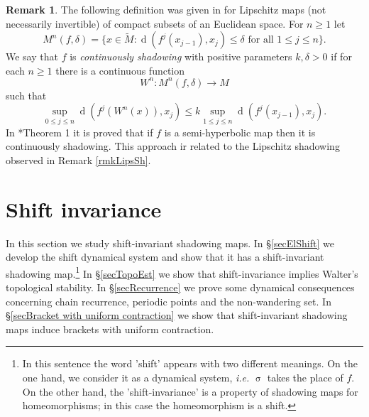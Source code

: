 \documentclass[12pt]{amsart}
\DeclareMathOperator{\shift}{\sigma}
\theoremstyle{plain}
\theoremstyle{definition}
\newtheorem{rmk}[thm]{Remark}
\theoremstyle{remark}
\DeclareMathOperator{\dist}{d}
\newcommand{\tM}{\tilde{M}}
\newcommand{\rojo}[1]{\textcolor{red}{#1}}
\begin{document}
\begin{rmk}
	\label{rmkKOP}
	The following definition was given in \cite{KOP} for Lipschitz maps (not necessarily invertible) of compact subsets of an Euclidean space.
	For $n\geq 1$ let
	\[
	M^n(f,\delta)=\{x\in\tM:\dist(f^j(x_{j-1}),x_j)\leq\delta\text{ for all }1\leq j\leq n\}.
	\]
	We say that $f$ is \textit{continuously shadowing} with positive parameters $k,\delta>0$
	if for each $n\geq 1$ there is a continuous function
	\[
	W^n\colon M^n(f,\delta)\to M
	\]
	such that
	\begin{equation}
		\label{ecuContShKop}
		\sup_{0\leq j\leq n}\dist(f^j(W^n(x)),x_j) \leq k \sup_{1\leq j\leq n}\dist(f^j(x_{j-1}),x_j).
	\end{equation}
	In \cite{KOP}*{Theorem 1} it is proved that
	if $f$ is a semi-hyperbolic map then it is continuously shadowing.
	This approach ir related to the Lipschitz shadowing observed in Remark \ref{rmkLipsSh}.
\end{rmk}

%
%
%

\section{Shift invariance}
\label{secShInvShm}
In this section we study shift-invariant shadowing maps.
In \S\ref{secElShift} we develop the shift dynamical system and show that it has a shift-invariant shadowing map.\footnote{In this sentence the word 'shift' appears with two different meanings. On the one hand, we consider it as a dynamical system, \textit{i.e.} $\shift$ takes the place of $f$.
On the other hand, the 'shift-invariance' is a property of shadowing maps for homeomorphisms; in this case the homeomorphism is a shift.}
In \S\ref{secTopoEst} we show that shift-invariance implies Walter's topological stability.
In \S\ref{secRecurrence} we prove some dynamical consequences concerning
chain recurrence, periodic points and the non-wandering set.
In \S\ref{secBracket with uniform contraction} we show that shift-invariant shadowing maps induce brackets with uniform contraction.
\end{document}
